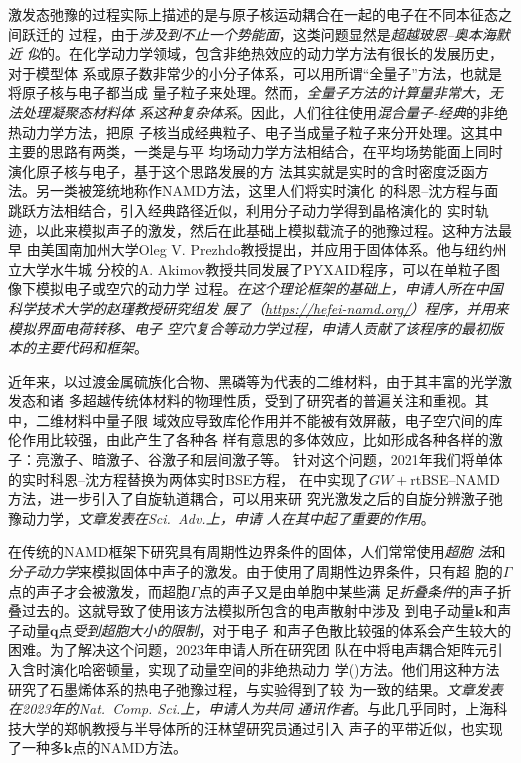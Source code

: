 激发态弛豫的过程实际上描述的是与原子核运动耦合在一起的电子在不同本征态之间跃迁的
过程，由于\emph{涉及到不止一个势能面}，这类问题显然是\emph{超越玻恩--奥本海默近
  似}的。在化学动力学领域，包含非绝热效应的动力学方法有很长的发展历史，对于模型体
系或原子数非常少的小分子体系，可以用所谓“全量子”方法，也就是将原子核与电子都当成
量子粒子来处理。然而，\emph{全量子方法的计算量非常大}，\emph{无法处理凝聚态材料体
  系这种复杂体系}。因此，人们往往使用\emph{混合量子-经典}的非绝热动力学方法，把原
子核当成经典粒子、电子当成量子粒子来分开处理。这其中主要的思路有两类，一类是与平
均场动力学方法相结合，在平均场势能面上同时演化原子核与电子，基于这个思路发展的方
法其实就是实时的含时密度泛函方法。另一类被笼统地称作NAMD方法，这里人们将实时演化
的科恩--沈方程与面跳跃方法相结合，引入经典路径近似，利用分子动力学得到晶格演化的
实时轨迹，以此来模拟声子的激发，然后在此基础上模拟载流子的弛豫过程。这种方法最早
由美国南加州大学Oleg V. Prezhdo教授提出，并应用于固体体系。他与纽约州立大学水牛城
分校的A. Akimov教授共同发展了PYXAID程序，可以在单粒子图像下模拟电子或空穴的动力学
过程。\emph{在这个理论框架的基础上，申请人所在中国科学技术大学的赵瑾教授研究组发
  展了\hnamd{}（\url{https://hefei-namd.org/}）程序，并用来模拟界面电荷转移、电子
  空穴复合等动力学过程，申请人贡献了该程序的最初版本的主要代码和框架}。

近年来，以过渡金属硫族化合物、黑磷等为代表的二维材料，由于其丰富的光学激发态和诸
多超越传统体材料的物理性质，受到了研究者的普遍关注和重视。其中，二维材料中量子限
域效应导致库伦作用并不能被有效屏蔽，电子空穴间的库伦作用比较强，由此产生了各种各
样有意思的多体效应，比如形成各种各样的激子：亮激子、暗激子、谷激子和层间激子等。
针对这个问题，2021年我们将单体的实时科恩--沈方程替换为两体实时BSE方程，
在\hnamd{}中实现了$GW{}+{}$rtBSE--NAMD方法，进一步引入了自旋轨道耦合，可以用来研
究光激发之后的自旋分辨激子弛豫动力学，\emph{文章发表在\textit{Sci.\ Adv.}上，申请
  人在其中起了重要的作用}。


在传统的NAMD框架下研究具有周期性边界条件的固体，人们常常使用\emph{超胞
  法}和\emph{分子动力学}来模拟固体中声子的激发。由于使用了周期性边界条件，只有超
胞的$\Gamma$点的声子才会被激发，而超胞$\Gamma$点的声子又是由单胞中某些满
足\emph{折叠条件}的声子折叠过去的。这就导致了使用该方法模拟所包含的电声散射中涉及
到电子动量$\mathbf{k}$和声子动量$\mathbf{q}$点\emph{受到超胞大小的限制}，对于电子
和声子色散比较强的体系会产生较大的困难。为了解决这个问题，2023年申请人所在研究团
队在\hnamd{}中将电声耦合矩阵元引入含时演化哈密顿量，实现了动量空间的非绝热动力
学(\namdk{})方法。他们用这种方法研究了石墨烯体系的热电子弛豫过程，与实验得到了较
为一致的结果。\emph{文章发表在2023年的\textit{Nat.\ Comp.  Sci.}上，申请人为共同
  通讯作者}。与此几乎同时，上海科技大学的郑帆教授与半导体所的汪林望研究员通过引入
声子的平带近似，也实现了一种多$\mathbf{k}$点的NAMD方法。



